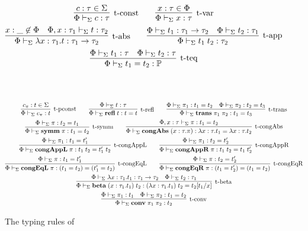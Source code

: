 \documentclass[10pt]{article}
\begin{document}
\begin{figure}[ht!]
\begin{gather*}  
\infer[\mbox{\typconst}]{
  \typeof{\Sigma}{\Phi}{c}{\tau}
}{
  c:\tau \in \Sigma
}
\qquad
\infer[\mbox{\typvar}]{
  \typeof{\Sigma}{\Phi}{x}{\tau}
}{
  x:\tau \in \Phi
}
\\
\infer[\mbox{\typabs}]{
  \typeof{\Sigma}{\Phi}{\tabs{x}{\tau_1}{t}}{\tau_1 \to \tau_2}
}{
  x:\_ \not\in\Phi 
  &
  \typeof{\Sigma}{\Phi,x:\tau_1}{t}{\tau_2}
}
\qquad
\infer[\mbox{\typapp}]{
  \typeof{\Sigma}{\Phi}{t_1\app t_2}{\tau_2}
}{
  \typeof{\Sigma}{\Phi}{t_1}{\tau_1 \to \tau_2}
  &
  \typeof{\Sigma}{\Phi}{t_2}{\tau_1}
}
\\
\infer[\mbox{\typteq}]{
  \typeof{\Sigma}{\Phi}{t_1 = t_2}{\prop}
}{
  \typeof{\Sigma}{\Phi}{t_1}{\tau}
  &
  \typeof{\Sigma}{\Phi}{t_2}{\tau}
}
\end{gather*}
\\
\\
\begin{gather*}
\infer[\mbox{\typpconst}]{
  \typeof{\Sigma}{\Phi}{c_\pi}{t}
}{
  c_\pi:t \in \Sigma
}
\qquad
\infer[\mbox{\typrefl}]{
  \typeof{\Sigma}{\Phi}{\refl t}{t = t}
}{
  \typeof{\Sigma}{\Phi}{t}{\tau}
}
\qquad
\infer[\mbox{\typtrans}]{
  \typeof{\Sigma}{\Phi}{\trans{\pi_1}{\pi_2}}{t_1 = t_3}
}{
  \typeof{\Sigma}{\Phi}{\pi_1}{t_1 = t_2}
  &
  \typeof{\Sigma}{\Phi}{\pi_2}{t_2 = t_3}
}
\\
\infer[\mbox{\typsymm}]{
  \typeof{\Sigma}{\Phi}{\symm{\pi}}{t_1 = t_2}
}{
  \typeof{\Sigma}{\Phi}{\pi}{t_2 = t_1}
}
\qquad
\infer[\mbox{\typcongabs}]{
  \typeof{\Sigma}{\Phi}{\congtabs{x}{\tau}{\pi}}{\tabs{x}{\tau}{t_1} = \tabs{x}{\tau}{t_2}}
}{
  \typeof{\Sigma}{\Phi,x:\tau}{\pi}{t_1 = t_2}
}
\\
\infer[\mbox{\typcongappl}]{
  \typeof{\Sigma}{\Phi}{\congappl{\pi}}{t_1\app t_2 = t_1'\app t_2}
}{
  \typeof{\Sigma}{\Phi}{\pi_1}{t_1 = t_1'}
}
\qquad
\infer[\mbox{\typcongappr}]{
  \typeof{\Sigma}{\Phi}{\congappr{\pi}}{t_1\app t_2 = t_1\app t_2'}
}{
  \typeof{\Sigma}{\Phi}{\pi_1}{t_2 = t_2'}
}
\\
\infer[\mbox{\typcongeql}]{
  \typeof{\Sigma}{\Phi}{\congeql{\pi}}{(t_1 = t_2) = (t_1' = t_2)}
}{
  \typeof{\Sigma}{\Phi}{\pi}{t_1 = t_1'}
}
\qquad
\infer[\mbox{\typcongeqr}]{
  \typeof{\Sigma}{\Phi}{\congeqr{\pi}}{(t_1 = t_2') = (t_1 = t_2)}
}{
  \typeof{\Sigma}{\Phi}{\pi}{t_2 = t_2'}
}
\\
\infer[\mbox{\typbeta}]{
  \typeof{\Sigma}{\Phi}{\tbetaconv{x}{\tau_1}{t_1}{t_2}}{(\tabs{x}{\tau_1}{t_1})\app t_2 = t_2[t_1/x]}
}{
  \typeof{\Sigma}{\Phi}{\tabs{x}{\tau_1}{t_1}}{\tau_1 \to \tau_2}
  &
  \typeof{\Sigma}{\Phi}{t_2}{\tau_1}
}
\\
\infer[\mbox{\typconv}]{
  \typeof{\Sigma}{\Phi}{\conv{\pi_1}{\pi_2}}{t_2}
}{
  \typeof{\Sigma}{\Phi}{\pi_1}{t_1}
  &
  \typeof{\Sigma}{\Phi}{\pi_2}{t_1 = t_2}
}
\end{gather*}  
  
\caption{The typing rules of \STLCE}
\label{fig:stlce-typing-rules}
\end{figure}
\end{document}
